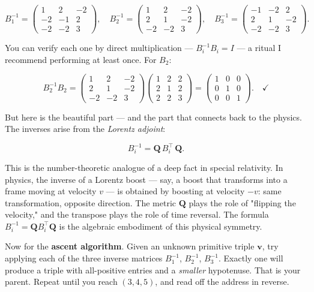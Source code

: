 \[B_1^{-1} = \begin{pmatrix} 1 & 2 & -2 \\ -2 & -1 & 2 \\ -2 & -2 & 3 \end{pmatrix}, \quad B_2^{-1} = \begin{pmatrix} 1 & 2 & -2 \\ 2 & 1 & -2 \\ -2 & -2 & 3 \end{pmatrix}, \quad B_3^{-1} = \begin{pmatrix} -1 & -2 & 2 \\ 2 & 1 & -2 \\ -2 & -2 & 3 \end{pmatrix}.\]

You can verify each one by direct multiplication --- $B_i^{-1} B_i = I$ --- a ritual I recommend performing at least once. For $B_2$:

\[B_2^{-1} B_2 = \begin{pmatrix} 1 & 2 & -2 \\ 2 & 1 & -2 \\ -2 & -2 & 3 \end{pmatrix} \begin{pmatrix} 1 & 2 & 2 \\ 2 & 1 & 2 \\ 2 & 2 & 3 \end{pmatrix} = \begin{pmatrix} 1 & 0 & 0 \\ 0 & 1 & 0 \\ 0 & 0 & 1 \end{pmatrix}. \quad \checkmark\]

But here is the beautiful part --- and the part that connects back to the physics. The inverses arise from the \textit{Lorentz adjoint}:

\[B_i^{-1} = \mathbf{Q} \, B_i^\top \, \mathbf{Q}.\]

This is the number-theoretic analogue of a deep fact in special relativity. In physics, the inverse of a Lorentz boost --- say, a boost that transforms into a frame moving at velocity $v$ --- is obtained by boosting at velocity $-v$: same transformation, opposite direction. The metric $\mathbf{Q}$ plays the role of "flipping the velocity," and the transpose plays the role of time reversal. The formula $B_i^{-1} = \mathbf{Q} B_i^\top \mathbf{Q}$ is the algebraic embodiment of this physical symmetry.

Now for the \textbf{ascent algorithm}. Given an unknown primitive triple $\mathbf{v}$, try applying each of the three inverse matrices $B_1^{-1}$, $B_2^{-1}$, $B_3^{-1}$. Exactly one will produce a triple with all-positive entries and a \textit{smaller} hypotenuse. That is your parent. Repeat until you reach $(3, 4, 5)$, and read off the address in reverse.

